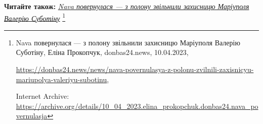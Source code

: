  
 
 
 
 

\textbf{Читайте також:} \href{https://archive.org/details/10_04_2023.elina_prokopchuk.donbas24.nava_povernulasja}{\emph{Nava повернулася — з полону звільнили захисницю Маріуполя Валерію Суботіну}}%
\footnote{Nava повернулася — з полону звільнили захисницю Маріуполя Валерію Суботіну, Еліна Прокопчук, donbas24.news, 10.04.2023, \par%
\url{https://donbas24.news/news/nava-povernulasya-z-polonu-zvilnili-zaxisnicyu-mariupolya-valeriyu-subotinu}, \par%
Internet Archive: \url{https://archive.org/details/10_04_2023.elina_prokopchuk.donbas24.nava_povernulasja}%
}
